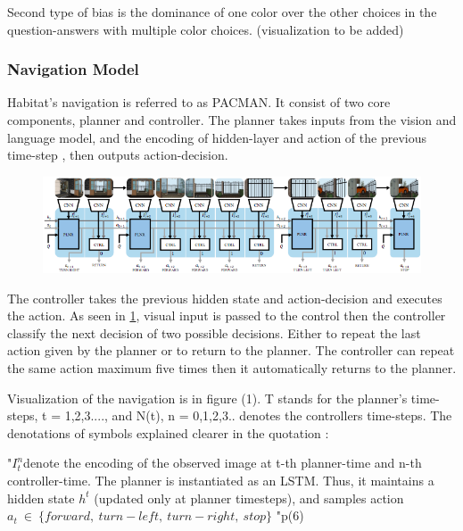 Second type of bias is the dominance of one color over the other choices in the question-answers with multiple color choices. (visualization to be added)



\subsubsection{Navigation Model}


Habitat's navigation is referred to as PACMAN. It consist of two core components, planner and controller. The planner takes inputs from the vision and language model, and the encoding of hidden-layer and action of the previous time-step , then outputs action-decision. 

\begin{figure}[H]
\includegraphics[scale=0.53]{images/nav.png}
\caption{}
\label{fig:nav}
\end{figure}

The controller takes the previous hidden state and action-decision and executes the action. As seen in \ref{fig:nav}, visual input is passed to the control then the controller classify the next decision of two possible decisions. Either to repeat the last action given by the planner or to return to the planner. The controller can repeat the same action maximum five times then it automatically returns to the planner. 

Visualization of the navigation is in figure (1). T stands for the planner's time-steps, t = 1,2,3...., and N(t),  n = 0,1,2,3.. denotes the controllers time-steps. The denotations of symbols explained clearer in the quotation : 


"\begin{math}  I_{t}^{n} \end{math}denote the encoding of the observed image at t-th planner-time and n-th controller-time. The planner is instantiated as an LSTM. Thus, it maintains a hidden state \begin{math} h^{t}\end{math}
(updated only at planner timesteps), and samples action 
\begin{math}  a_{t} \ \in \ \{forward,\ turn-left,\ turn-right,\ stop\} \end{math} "p(6)
\vspace{0.3cm}

